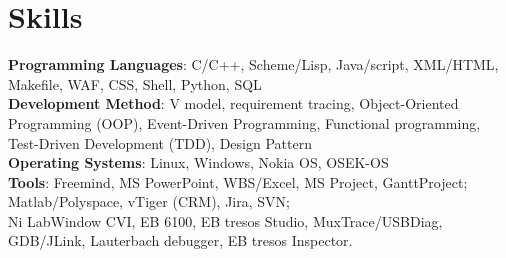 
\section{Skills}
\textbf{Programming Languages}: C/C++, Scheme/Lisp, Java/script, XML/HTML, Makefile, WAF, CSS, Shell, Python, SQL\\
\textbf{Development Method}:
V model, requirement tracing,
Object-Oriented Programming (OOP),
Event-Driven Programming,
Functional programming,
Test-Driven Development (TDD),
Design Pattern\\
\textbf{Operating Systems}: Linux, Windows, Nokia OS, OSEK-OS\\
\textbf{Tools}:
Freemind,
MS PowerPoint,
WBS/Excel, MS Project, GanttProject;\\
Matlab/Polyspace,
vTiger (CRM), Jira, SVN;\\
Ni LabWindow CVI,
EB 6100, EB tresos Studio, MuxTrace/USBDiag, GDB/JLink, Lauterbach debugger, EB tresos Inspector. \\

